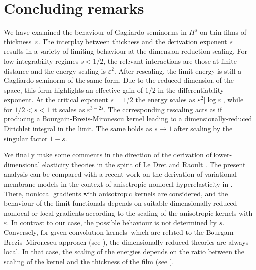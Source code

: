 \documentclass[11pt]{article}
\def\e{\varepsilon}
\begin{document}
\section{Concluding remarks}
We have examined the behaviour of Gagliardo seminorms in $H^s$ on thin films of thickness~$\e$. The interplay between thickness and the derivation exponent $s$ results in a variety of limiting behaviour at the dimension-reduction scaling. For low-integrability regimes $ s<1/2$, the relevant interactions are those at finite distance and the energy scaling is $\e^{2}$. After rescaling, the limit energy is still a Gagliardo seminorm of the same form. Due to the reduced dimension of the space, this form highlights an effective gain of $1/2$ in the differentiability exponent. At the critical exponent $s=1/2$ the energy scales as $\e^2|\log\e|$, while for $1/2<s<1$ it scales as $\e^{3-2s}$. The corresponding rescaling acts as if producing a Bourgain-Brezis-Mironescu kernel leading to a dimensionally-reduced Dirichlet integral in the limit. The same holds as $s\to 1$ after scaling by the singular factor $1-s$. 

We finally make some comments in the direction of the derivation of lower-dimensional elasticity theories in the spirit of Le Dret and Raoult \cite{LDR}.  The present analysis can be compared with a recent work on the derivation of variational membrane models in the context of anisotropic nonlocal hyperelasticity in \cite{engl2026derivationvariationalmembranemodels}. There, nonlocal gradients with anisotropic kernels are considered, and the behaviour of the limit functionals depends on suitable dimensionally reduced nonlocal or local gradients according to the scaling of the anisotropic kernels with $\e$. In contrast to our case, the possible behaviour is not determined by $s$. Conversely, for given convolution kernels, which are related to the Bourgain--Brezis--Mironescu approach (see \cite{AABPT}), the dimensionally reduced theories are always local. In that case, the scaling of the energies depends on the ratio between the scaling of the kernel and the thickness of the film (see \cite{Ansinitribuzio}).
\end{document}
